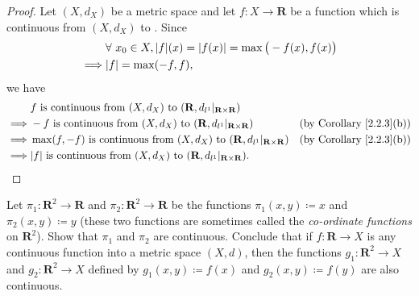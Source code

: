 \begin{proof}
    Let \((X, d_X)\) be a metric space and let \(f : X \to \mathbf{R}\) be a function which is continuous from \((X, d_X)\) to \(\).
    Since
    \begin{align*}
                 & \forall\ x_0 \in X, \abs*{f}(x) = \abs*{f(x)} = \max\big(-f(x), f(x)\big) \\
        \implies & \abs*{f} = \max(-f, f),
    \end{align*}
    we have
    \begin{align*}
                 & f \text{ is continuous from } (X, d_X) \text{ to } (\mathbf{R}, d_{l^1}|_{\mathbf{R} \times \mathbf{R}})                                                  \\
        \implies & -f \text{ is continuous from } (X, d_X) \text{ to } (\mathbf{R}, d_{l^1}|_{\mathbf{R} \times \mathbf{R}})          & \text{(by Corollary \ref{2.2.3}(b))} \\
        \implies & \max(f, -f) \text{ is continuous from } (X, d_X) \text{ to } (\mathbf{R}, d_{l^1}|_{\mathbf{R} \times \mathbf{R}}) & \text{(by Corollary \ref{2.2.3}(b))} \\
        \implies & \abs*{f} \text{ is continuous from } (X, d_X) \text{ to } (\mathbf{R}, d_{l^1}|_{\mathbf{R} \times \mathbf{R}}).
    \end{align*}
\end{proof}

\begin{exercise}\label{ex 2.2.4}
    Let \(\pi_1 : \mathbf{R}^2 \to \mathbf{R}\) and \(\pi_2 : \mathbf{R}^2 \to \mathbf{R}\) be the functions \(\pi_1(x, y) \coloneqq x\) and \(\pi_2(x, y) \coloneqq y\) (these two functions are sometimes called the \emph{co-ordinate functions} on \(\mathbf{R}^2\)).
    Show that \(\pi_1\) and \(\pi_2\) are continuous.
    Conclude that if \(f : \mathbf{R} \to X\) is any continuous function into a metric space \((X, d)\), then the functions \(g_1 : \mathbf{R}^2 \to X\) and \(g_2 : \mathbf{R}^2 \to X\) defined by \(g_1(x, y) \coloneqq f(x)\) and \(g_2(x, y) \coloneqq f(y)\) are also continuous.
\end{exercise}

